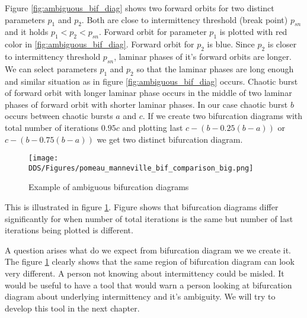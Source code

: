 Figure \ref{fig:ambiguous_bif_diag} shows two forward orbits for two distinct parameters $p_1$ and $p_2$.
Both are close to intermittency threshold (break point) $p_{sn}$ and it holds $p_1 < p_2 < p_{sn}$.
Forward orbit for parameter $p_1$ is plotted with red color in \ref{fig:ambiguous_bif_diag}.
Forward orbit for $p_2$ is blue.
Since $p_2$ is closer to intermittency threshold $p_{sn}$, laminar phases of it's forward orbits are longer.
We can select parameters $p_1$ and $p_2$ so that the laminar phases are long enough and similar situation as in figure \ref{fig:ambiguous_bif_diag} occurs.
Chaotic burst of forward orbit with longer laminar phase occurs in the middle of two laminar phases of forward orbit with shorter laminar phases.
In our case chaotic burst $b$ occurs between chaotic bursts $a$ and $c$.
If we create two bifurcation diagrams with total number of iterations $0.95 c$ and plotting last $c-(b-0.25(b-a))$ or $c-(b-0.75(b-a))$ we get two distinct bifurcation diagram.


\begin{figure}[!h]
    \centering
    \texttt{[image: DDS/Figures/pomeau\_manneville\_bif\_comparison\_big.png]}
    \caption{Example of ambiguous bifurcation diagrams}
    \label{fig:ambiguous_bif_diag_example}
\end{figure}

This is illustrated in figure \ref{fig:ambiguous_bif_diag_example}.
Figure shows that bifurcation diagrams differ significantly for when number of total iterations is the same but number of last iterations being plotted is different.
\par
A question arises what do we expect from bifurcation diagram we we create it.
The figure \ref{fig:ambiguous_bif_diag_example} clearly shows that the same region of bifurcation diagram can look very different.
A person not knowing about intermittency could be misled.
It would be useful to have a tool that would warn a person looking at bifurcation diagram about underlying intermittency and it's ambiguity.
We will try to develop this tool in the next chapter.

\endinput